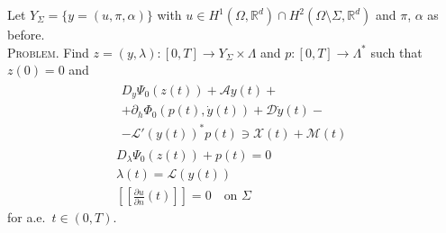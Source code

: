 \documentclass[8pt]{beamer}
\numberwithin{equation}{section}
\theoremstyle{definition}
\newcommand{\dind}[2]{\frac{\partial #1}{\partial #2}}
\begin{document}
\begin{frame}
\begin{minipage}[c]{0.5\textwidth}
\begin{center}
\end{center}
\end{minipage}
\hspace{0.02\textwidth}
\begin{minipage}[c]{0.45\textwidth}
Let $Y_\Sigma=\{y=(u,\pi,\alpha)\}$ with $u\in H^1(\Omega,\mathbb{R}^d)\cap H^2(\Omega\setminus\Sigma,\mathbb{R}^d)$ and $\pi$, $\alpha$ as before.
\\[0.5em]
\textsc{Problem.} Find $z=(y,\lambda)\colon[0,T]\to Y_\Sigma\times\Lambda$ and $p\colon[0,T]\to\Lambda^*$ such that $z(0)=0$ and
\begin{gather*}
\begin{multlined}
D_y\Psi_0(z(t))+\mathcal{A}y(t)+\\
+\partial_h\Phi_0(p(t),\dot y(t))+\mathcal{D}\dot y(t)-\\
-\mathscr{L}'(y(t))^*p(t)\ni\mathscr{X}(t)+\mathcal{M}(t)
\end{multlined} \\[0.5em]
D_\lambda\Psi_0(z(t))+p(t)=0 \\[0.5em]
\lambda(t)=\mathscr{L}(y(t)) \\[0.5em]
\left[\!\!\left[\dind{u}{n}(t)\right]\!\!\right]=0\quad\text{on $\Sigma$}
\end{gather*}
for a.e.\ $t\in(0,T)$.
\end{minipage}
\end{frame}
\end{document}
